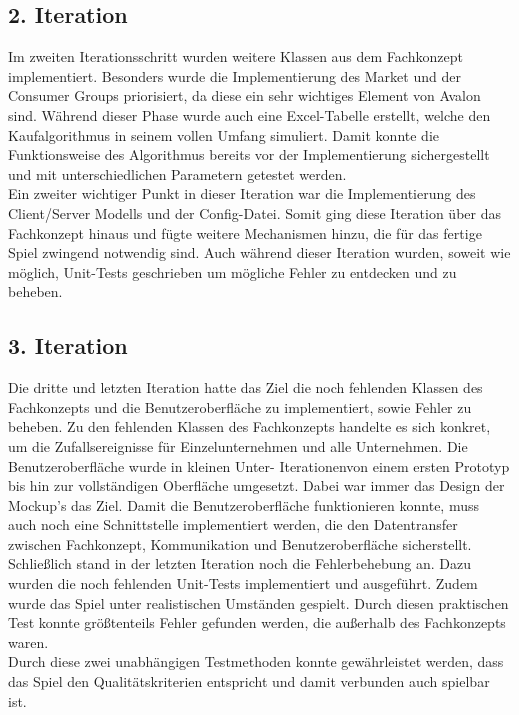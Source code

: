 \subsection{2. Iteration}
Im zweiten Iterationsschritt wurden weitere Klassen aus dem Fachkonzept implementiert. Besonders wurde die Implementierung des Market und der Consumer Groups priorisiert, da diese ein sehr wichtiges Element von Avalon sind. Während dieser Phase wurde auch eine Excel-Tabelle erstellt, welche den Kaufalgorithmus in seinem vollen Umfang simuliert. Damit konnte die Funktionsweise des Algorithmus bereits vor der Implementierung sichergestellt und mit unterschiedlichen Parametern getestet werden. \\
Ein zweiter wichtiger Punkt in dieser Iteration war die Implementierung des Client/Server Modells und der Config-Datei. Somit ging diese Iteration über das Fachkonzept hinaus und fügte weitere Mechanismen hinzu, die für das fertige Spiel zwingend notwendig sind. Auch während dieser Iteration wurden, soweit wie möglich, Unit-Tests geschrieben um mögliche Fehler zu entdecken und zu beheben. 

\subsection{3. Iteration}
Die dritte und letzten Iteration hatte das Ziel die noch fehlenden Klassen des Fachkonzepts und die Benutzeroberfläche zu implementiert, sowie Fehler zu beheben. Zu den fehlenden Klassen des Fachkonzepts handelte es sich konkret, um die Zufallsereignisse für Einzelunternehmen und alle Unternehmen. Die Benutzeroberfläche wurde in kleinen \glqq Unter- Iterationen\grqq  von einem ersten Prototyp bis hin zur vollständigen Oberfläche umgesetzt. Dabei war immer das Design der Mockup's das Ziel. Damit die Benutzeroberfläche funktionieren konnte, muss auch noch eine Schnittstelle implementiert werden, die den Datentransfer zwischen Fachkonzept, Kommunikation und Benutzeroberfläche sicherstellt.\\
Schließlich stand in der letzten Iteration noch die Fehlerbehebung an. Dazu wurden die noch fehlenden Unit-Tests implementiert und ausgeführt. Zudem wurde das Spiel unter realistischen Umständen gespielt. Durch diesen praktischen Test konnte größtenteils Fehler gefunden werden, die außerhalb des Fachkonzepts waren.\\
Durch diese zwei unabhängigen Testmethoden konnte gewährleistet werden, dass das Spiel den Qualitätskriterien entspricht und damit verbunden auch spielbar ist.

